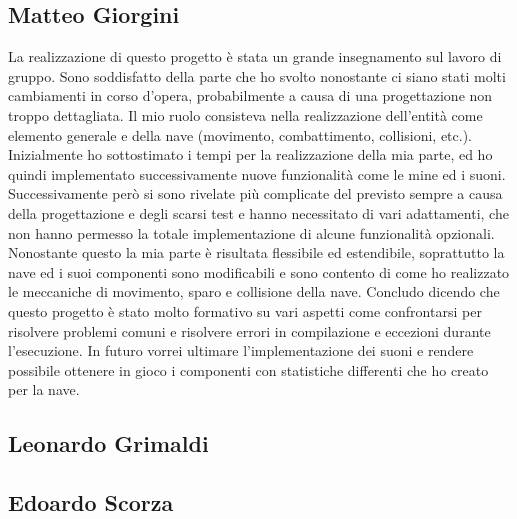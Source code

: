 \documentclass[a4paper,12pt]{report}
\begin{document}
\subsection*{Matteo Giorgini}
La realizzazione di questo progetto è stata un grande insegnamento sul lavoro di gruppo.
%
Sono soddisfatto della parte che ho svolto nonostante ci siano stati molti cambiamenti in corso d'opera, probabilmente a causa di una progettazione non troppo dettagliata.
%
Il mio ruolo consisteva nella realizzazione dell'entità come elemento generale e della nave (movimento, combattimento, collisioni, etc.).
%
Inizialmente ho sottostimato i tempi per la realizzazione della mia parte, ed ho quindi implementato successivamente nuove funzionalità come le mine ed i suoni.
%
Successivamente però si sono rivelate più complicate del previsto sempre a causa della progettazione e degli scarsi test e hanno necessitato di vari adattamenti,
che non hanno permesso la totale implementazione di alcune funzionalità opzionali.
%
Nonostante questo la mia parte è risultata flessibile ed estendibile, soprattutto la nave ed i suoi componenti sono modificabili e sono contento di come ho realizzato le meccaniche di movimento, sparo e collisione della nave.
%
Concludo dicendo che questo progetto è stato molto formativo su vari aspetti come confrontarsi per risolvere problemi comuni e risolvere errori in compilazione e eccezioni durante l'esecuzione.
%
In futuro vorrei ultimare l'implementazione dei suoni e rendere possibile ottenere in gioco i componenti con statistiche differenti che ho creato per la nave.

\subsection*{Leonardo Grimaldi}

\subsection*{Edoardo Scorza}
\end{document}
